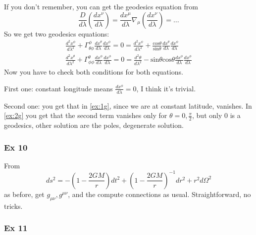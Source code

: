 If you don't remember, you can get the geodesics equation from
\[
\frac{D}{d\lambda }\left( \frac{dx^{\nu }}{d\lambda } \right) = \frac{d x^{\mu }}{d \lambda }\nabla _{\mu }\left( \frac{d x^{\nu }}{d \lambda } \right) = \ldots 
\]
So we get two geodesics equations:
\begin{gather}
	\frac{d ^{2}x^{\phi }}{d \lambda ^{2}} + \Gamma ^{\phi }_{\theta \phi }\frac{d x^{\theta }}{d \lambda }\frac{d x^{\phi }}{d \lambda } =0  = \frac{d ^{2}x^{\phi }}{d \lambda ^{2}} + \frac{\text{cos}\theta }{\text{sin}\theta }\frac{d x^{\theta }}{d \lambda }\frac{d x^{\phi }}{d \lambda } \label{ex:1g}\\
	\frac{d^{2}x^{\theta }}{d\lambda ^{2}} + \Gamma ^{\theta }_{\phi \phi }\frac{d x^{\phi }}{d \lambda }\frac{d x^{\phi }}{d \lambda } = 0  = \frac{d ^{2}\theta }{d \lambda ^{2}} - \text{sin}\theta \text{cos}\theta \frac{d x^{\phi }}{d \lambda }\frac{d x^{\phi }}{d \lambda }\label{ex:2g}
\end{gather}
Now you have to check both conditions for both equations.\par
First one: constant longitude means $\frac{d x^{\phi }}{d \lambda } = 0$, I think it's trivial. \par
Second one: you get that in \ref{ex:1g}, since we are at constant latitude, vanishes. In \ref{ex:2g} you get that the second term vanishes only for $\theta =0 , \frac{\pi }{2}$, but only 0 is a geodesics, other solution are the poles, degenerate solution. 

\subsubsection{Ex 10}
From 
\[
ds^{2 } = -\left( 1- \frac{2GM}{r} \right)dt^{2} + \left( 1 - \frac{2GM}{r} \right)^{-1}dr^{2} + r^{2}d\Omega ^{2}
\]
as before, get $g_{\mu \nu }, g^{\mu \nu }$, and the compute connections as usual. Straightforward, no tricks.

\subsubsection{Ex 11}























